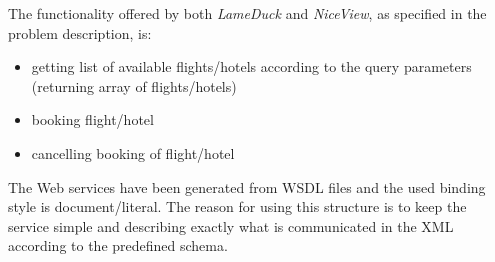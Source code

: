 The functionality offered by both \textit{LameDuck} and \textit{NiceView}, as specified in the problem description, is:
\begin{itemize}
\item getting list of available flights/hotels according to the query parameters (returning array of flights/hotels) 
\item booking flight/hotel
\item cancelling booking of flight/hotel
\end{itemize}

The Web services have been generated from WSDL files and the used binding style is document/literal. The reason for using this structure is to keep the service simple and describing exactly what is communicated in the XML according to the predefined schema.

